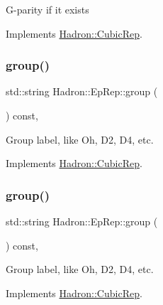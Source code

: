 G-\/parity if it exists 

Implements \mbox{\hyperlink{structHadron_1_1CubicRep_a52104e43266d1614c00bbd1c3b395458}{Hadron\+::\+Cubic\+Rep}}.

\mbox{\label{structHadron_1_1EpRep_a996c85eb1ef2784753bf82d2e15bc0ce}} 
\subsubsection{\texorpdfstring{group()}{group()}\hspace{0.1cm}{\footnotesize\ttfamily [1/2]}}
{\footnotesize\ttfamily std\+::string Hadron\+::\+Ep\+Rep\+::group (\begin{DoxyParamCaption}{ }\end{DoxyParamCaption}) const\hspace{0.3cm}{\ttfamily [inline]}, {\ttfamily [virtual]}}

Group label, like Oh, D2, D4, etc. 

Implements \mbox{\hyperlink{structHadron_1_1CubicRep_a0748f11ec87f387062c8e8981339a29c}{Hadron\+::\+Cubic\+Rep}}.

\mbox{\label{structHadron_1_1EpRep_a996c85eb1ef2784753bf82d2e15bc0ce}} 
\subsubsection{\texorpdfstring{group()}{group()}\hspace{0.1cm}{\footnotesize\ttfamily [2/2]}}
{\footnotesize\ttfamily std\+::string Hadron\+::\+Ep\+Rep\+::group (\begin{DoxyParamCaption}{ }\end{DoxyParamCaption}) const\hspace{0.3cm}{\ttfamily [inline]}, {\ttfamily [virtual]}}

Group label, like Oh, D2, D4, etc. 

Implements \mbox{\hyperlink{structHadron_1_1CubicRep_a0748f11ec87f387062c8e8981339a29c}{Hadron\+::\+Cubic\+Rep}}.

\mbox{\label{structHadron_1_1EpRep_aa5a9f64d0578ca4e2ba9abce86d06bd6}} 
